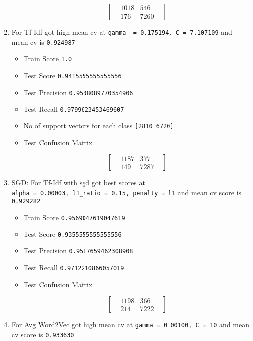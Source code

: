 \documentclass[11pt]{article}
\providecommand{\tightlist}{%
      \setlength{\itemsep}{0pt}\setlength{\parskip}{0pt}}
\begin{document}
\begin{enumerate}
\begin{itemize}
    \begin{equation}
    \begin{bmatrix}
    & 1018 & 546 &  \\
    & 176 & 7260 & 
    \end{bmatrix}
    \end{equation}
  \end{itemize}
\item
  For Tf-Idf got high mean cv at
  \texttt{gamma\ \ =\ 0.175194,\ C\ =\ 7.107109} and mean cv is
  \texttt{0.924987}

  \begin{itemize}
  \tightlist
  \item
    Train Score \texttt{1.0}
  \item
    Test Score \texttt{0.9415555555555556}
  \item
    Test Precision \texttt{0.9508089770354906}
  \item
    Test Recall \texttt{0.9799623453469607}
  \item
    No of support vectors for each class \texttt{{[}2810\ 6720{]}}
  \item
    Test Confusion Matrix

    \begin{equation}
    \begin{bmatrix}
    & 1187 & 377 &  \\
    & 149 & 7287 & 
    \end{bmatrix}
    \end{equation}
  \end{itemize}
\item
  SGD: For Tf-Idf with sgd got best scores at
  \texttt{alpha\ =\ 0.00003,\ l1\_ratio\ =\ 0.15,\ penalty\ =\ l1} and
  mean cv score is \texttt{0.929282}

  \begin{itemize}
  \tightlist
  \item
    Train Score \texttt{0.9569047619047619}
  \item
    Test Score \texttt{0.9355555555555556}
  \item
    Test Precision \texttt{0.9517659462308908}
  \item
    Test Recall \texttt{0.9712210866057019}
  \item
    Test Confusion Matrix

    \begin{equation}
    \begin{bmatrix}
    & 1198 & 366 &  \\
    & 214 & 7222 & 
    \end{bmatrix}
    \end{equation}
  \end{itemize}
\item
  For Avg Word2Vec got high mean cv at
  \texttt{gamma\ =\ 0.00100,\ C\ =\ 10} and mean cv score is
  \texttt{0.933630}


\end{enumerate}
\end{document}
